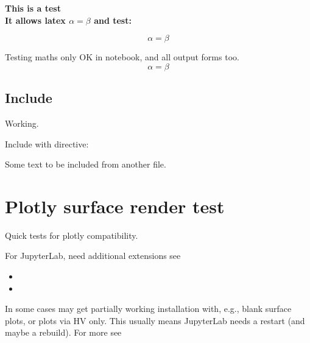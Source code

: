 \documentclass[letterpaper,10pt,english]{jupyterBook}
\begin{document}
\bf{This is a test} \\
It allows latex $\alpha=\beta$ and test:

\begin{equation}
\alpha = \beta
\end{equation}

\sphinxAtStartPar
Testing maths only \sphinxhyphen{} OK in notebook, and all output forms too.
\label{equation:tests/formatting_syntax_tests_081122:9956eb9e-0c5c-4ff2-bd3f-426dea130ff8}\begin{equation}
\alpha = \beta
\end{equation}

\section{Include}
\label{\detokenize{tests/formatting_syntax_tests_081122:include}}
\sphinxAtStartPar
Working.

\sphinxAtStartPar
Include with  directive:

\sphinxAtStartPar
Some text to be included from another file.

\sphinxstepscope


\chapter{Plotly surface render test}
\label{\detokenize{tests/plotly_surface_render_test:plotly-surface-render-test}}\label{\detokenize{tests/plotly_surface_render_test::doc}}
\sphinxAtStartPar
Quick tests for plotly compatibility.

\sphinxAtStartPar
For JupyterLab, need additional extensions \sphinxhyphen{} see 
\begin{itemize}
\item {} 
\sphinxAtStartPar
{}

\item {} 
\sphinxAtStartPar
{}

\end{itemize}

\sphinxAtStartPar
In some cases may get partially working installation with, e.g., blank surface plots, or plots via HV only. This usually means JupyterLab needs a restart (and maybe a rebuild).
For more see 
\end{document}
